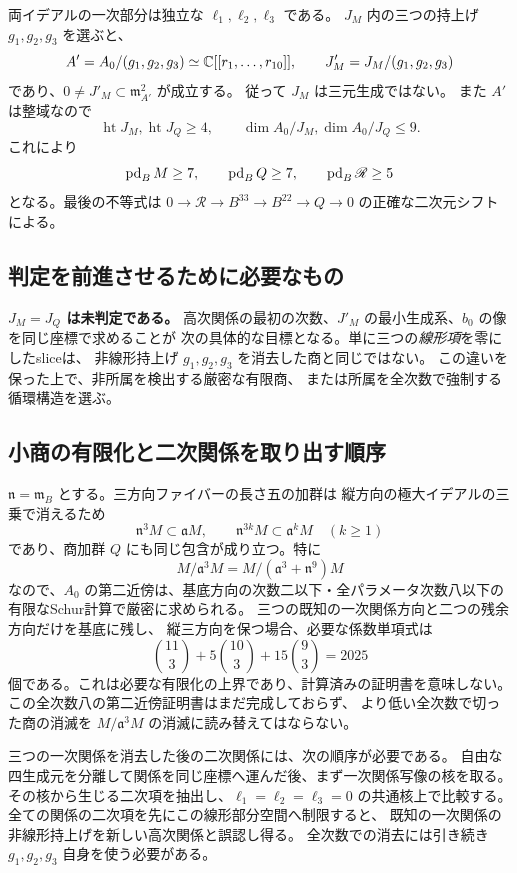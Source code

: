 両イデアルの一次部分は独立な $\ell_1,\ell_2,\ell_3$ である。
$J_M$ 内の三つの持上げ $g_1,g_2,g_3$ を選ぶと、
\[
 A'=A_0/(g_1,g_2,g_3)\simeq\mathbb C[[r_1,\ldots,r_{10}]],\qquad
 J'_M=J_M/(g_1,g_2,g_3)
\]
であり、\textbf{$0\ne J'_M\subset\mathfrak m_{A'}^2$} が成立する。
従って $J_M$ は三元生成ではない。
また $A'$ は整域なので
\[
 \operatorname{ht}J_M,\operatorname{ht}J_Q\ge4,
 \qquad \dim A_0/J_M,\dim A_0/J_Q\le9.
\]
これにより
\[
 \operatorname{pd}_BM\ge7,\qquad\operatorname{pd}_BQ\ge7,\qquad\operatorname{pd}_B\mathscr R\ge5
\]
となる。最後の不等式は
$0\to\mathscr R\to B^{33}\to B^{22}\to Q\to0$ の正確な二次元シフトによる。

\subsection{判定を前進させるために必要なもの}
\textbf{$J_M=J_Q$ は未判定である。}
高次関係の最初の次数、$J'_M$ の最小生成系、$b_0$ の像を同じ座標で求めることが
次の具体的な目標となる。単に三つの\emph{線形項}を零にしたsliceは、
非線形持上げ $g_1,g_2,g_3$ を消去した商と同じではない。
この違いを保った上で、非所属を検出する厳密な有限商、
または所属を全次数で強制する循環構造を選ぶ。

\subsection{小商の有限化と二次関係を取り出す順序}
$\mathfrak n=\mathfrak m_B$ とする。三方向ファイバーの長さ五の加群は
縦方向の極大イデアルの三乗で消えるため
\[
 \mathfrak n^3M\subset\mathfrak aM,\qquad
 \mathfrak n^{3k}M\subset\mathfrak a^kM\quad(k\ge1)
\]
であり、商加群 $Q$ にも同じ包含が成り立つ。特に
\[
 M/\mathfrak a^3M
 =M/(\mathfrak a^3+\mathfrak n^9)M
\]
なので、$A_0$ の第二近傍は、基底方向の次数二以下・全パラメータ次数八以下の
有限なSchur計算で厳密に求められる。
三つの既知の一次関係方向と二つの残余方向だけを基底に残し、
縦三方向を保つ場合、必要な係数単項式は
\[
 \binom{11}{3}+5\binom{10}{3}+15\binom{9}{3}=2025
\]
個である。これは必要な有限化の上界であり、計算済みの証明書を意味しない。
この全次数八の第二近傍証明書はまだ完成しておらず、
より低い全次数で切った商の消滅を $M/\mathfrak a^3M$ の消滅に読み替えてはならない。

三つの一次関係を消去した後の二次関係には、次の順序が必要である。
自由な四生成元を分離して関係を同じ座標へ運んだ後、まず一次関係写像の核を取る。
その核から生じる二次項を抽出し、$\ell_1=\ell_2=\ell_3=0$ の共通核上で比較する。
全ての関係の二次項を先にこの線形部分空間へ制限すると、
既知の一次関係の非線形持上げを新しい高次関係と誤認し得る。
全次数での消去には引き続き $g_1,g_2,g_3$ 自身を使う必要がある。

